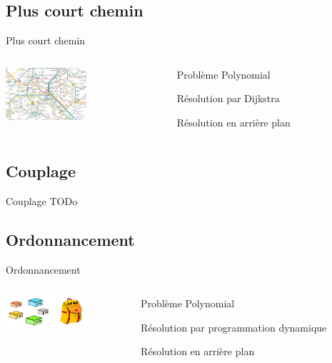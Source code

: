 \documentclass{beamer}
\begin{document}
	\subsection{Plus court chemin}
		\begin{frame}{Plus court chemin}
        \begin{columns}
            \begin{column}{0cm}
                \includegraphics[width=3cm]{images/metro.jpg}
            \end{column}
            \begin{column}{8cm}
                \begin{description}\itemsep15pt
                    \item Problème Polynomial
                    \item Résolution par Dijkstra
                    \item Résolution en arrière plan
                \end{description}
            \end{column}
        \end{columns}
		\end{frame}
	\subsection{Couplage}
		\begin{frame}{Couplage}
            TODo
		\end{frame}
	\subsection{Ordonnancement}
		\begin{frame}{Ordonnancement}
        \begin{columns}
            \begin{column}{0cm}
                \includegraphics[width=3cm]{images/knapsack.png}
            \end{column}
            \begin{column}{8cm}
                \begin{description}\itemsep15pt
                    \item Problème Polynomial
                    \item Résolution par programmation dynamique
                    \item Résolution en arrière plan
                \end{description}
            \end{column}
        \end{columns}
		\end{frame}
\end{document}
